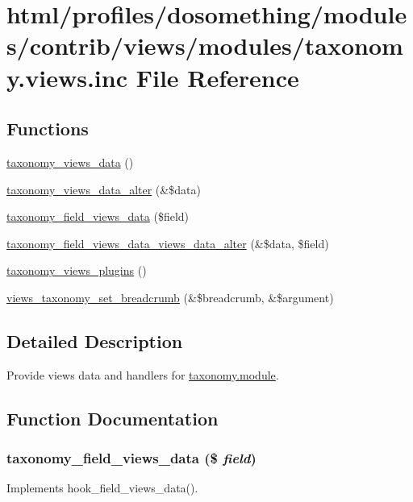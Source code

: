 \hypertarget{taxonomy_8views_8inc}{
\section{html/profiles/dosomething/modules/contrib/views/modules/taxonomy.views.inc File Reference}
\label{taxonomy_8views_8inc}
}
\subsection*{Functions}
\begin{DoxyCompactItemize}
\item 
\hyperlink{taxonomy_8views_8inc_a7d924f539ca1e7da381929bec742e8fd}{taxonomy\_\-views\_\-data} ()
\item 
\hyperlink{taxonomy_8views_8inc_aa6aab8471715a703a640f25f9cfe8efb}{taxonomy\_\-views\_\-data\_\-alter} (\&\$data)
\item 
\hyperlink{taxonomy_8views_8inc_a7f2e2d6594659210bd8a72f80efd88e6}{taxonomy\_\-field\_\-views\_\-data} (\$field)
\item 
\hyperlink{taxonomy_8views_8inc_a3bc51da9827bc04f4afe696788e313bd}{taxonomy\_\-field\_\-views\_\-data\_\-views\_\-data\_\-alter} (\&\$data, \$field)
\item 
\hyperlink{taxonomy_8views_8inc_adf4c4ae0f65e3a97003ca804bfff4c9c}{taxonomy\_\-views\_\-plugins} ()
\item 
\hyperlink{taxonomy_8views_8inc_ae3ea861745bda984b3d544ac856012e0}{views\_\-taxonomy\_\-set\_\-breadcrumb} (\&\$breadcrumb, \&\$argument)
\end{DoxyCompactItemize}


\subsection{Detailed Description}
Provide views data and handlers for \hyperlink{taxonomy_8module}{taxonomy.module}. 

\subsection{Function Documentation}
\hypertarget{taxonomy_8views_8inc_a7f2e2d6594659210bd8a72f80efd88e6}{
\subsubsection[{taxonomy\_\-field\_\-views\_\-data}]{\setlength{\rightskip}{0pt plus 5cm}taxonomy\_\-field\_\-views\_\-data (\$ {\em field})}}
\label{taxonomy_8views_8inc_a7f2e2d6594659210bd8a72f80efd88e6}
Implements hook\_\-field\_\-views\_\-data().

